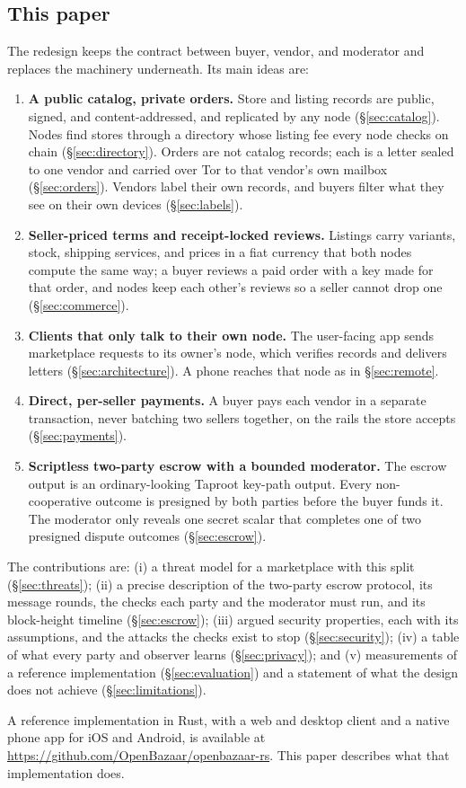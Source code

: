 \subsection{This paper}

The redesign keeps the contract between buyer, vendor, and moderator and replaces the machinery underneath. Its main ideas are:
\begin{enumerate}
  \item \textbf{A public catalog, private orders.} Store and listing records are public, signed, and content-addressed, and replicated by any node (\S\ref{sec:catalog}). Nodes find stores through a directory whose listing fee every node checks on chain (\S\ref{sec:directory}). Orders are not catalog records; each is a letter sealed to one vendor and carried over Tor to that vendor's own mailbox (\S\ref{sec:orders}). Vendors label their own records, and buyers filter what they see on their own devices (\S\ref{sec:labels}).
  \item \textbf{Seller-priced terms and receipt-locked reviews.} Listings carry variants, stock, shipping services, and prices in a fiat currency that both nodes compute the same way; a buyer reviews a paid order with a key made for that order, and nodes keep each other's reviews so a seller cannot drop one (\S\ref{sec:commerce}).
  \item \textbf{Clients that only talk to their own node.} The user-facing app sends marketplace requests to its owner's node, which verifies records and delivers letters (\S\ref{sec:architecture}). A phone reaches that node as in \S\ref{sec:remote}.
  \item \textbf{Direct, per-seller payments.} A buyer pays each vendor in a separate transaction, never batching two sellers together, on the rails the store accepts (\S\ref{sec:payments}).
  \item \textbf{Scriptless two-party escrow with a bounded moderator.} The escrow output is an ordinary-looking Taproot key-path output. Every non-cooperative outcome is presigned by both parties before the buyer funds it. The moderator only reveals one secret scalar that completes one of two presigned dispute outcomes (\S\ref{sec:escrow}).
\end{enumerate}

The contributions are: (i) a threat model for a marketplace with this split (\S\ref{sec:threats}); (ii) a precise description of the two-party escrow protocol, its message rounds, the checks each party and the moderator must run, and its block-height timeline (\S\ref{sec:escrow}); (iii) argued security properties, each with its assumptions, and the attacks the checks exist to stop (\S\ref{sec:security}); (iv) a table of what every party and observer learns (\S\ref{sec:privacy}); and (v) measurements of a reference implementation (\S\ref{sec:evaluation}) and a statement of what the design does not achieve (\S\ref{sec:limitations}).

A reference implementation in Rust, with a web and desktop client and a native phone app for iOS and Android, is available at \url{https://github.com/OpenBazaar/openbazaar-rs}. This paper describes what that implementation does.
